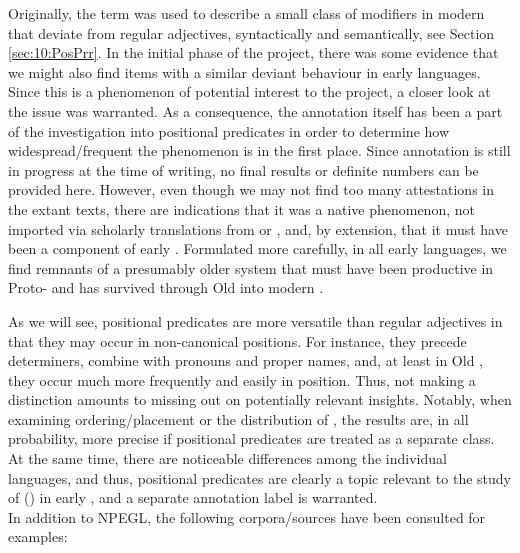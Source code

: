 \documentclass[output=paper,colorlinks,citecolor=brown]{langscibook}
\begin{document}
Originally, the term  was used to describe a small class of modifiers in modern  that deviate from regular adjectives, syntactically and semantically, see Section \ref{sec:10:PosPrr}. In the initial phase of the project, there was some evidence that we might also find items with a similar deviant behaviour in early  languages. Since this is a phenomenon of potential interest to the project, a closer look  at the issue was warranted. As a consequence, the annotation itself has been a part of the investigation into positional predicates in order to determine how widespread/frequent the phenomenon is %
in the first place. Since annotation is still in progress at the time of writing, no final results or definite numbers can be provided here. However, even though we may not find too many attestations in the extant texts, there are indications that it was a native phenomenon, not imported via scholarly translations from  or , and, by extension, that it must have been a component of early  . Formulated more carefully, in all early  languages, we find remnants of a presumably older system that must have been productive in  Proto- and has survived through Old  into modern .

As we will see, positional predicates are more versatile than regular adjectives in that they may occur in non-canonical  positions. For instance, they precede determiners, combine with pronouns and proper names, and, at least in Old , they occur much more frequently and easily in  position. Thus, not making a distinction amounts to missing out on potentially relevant insights.  Notably, when examining  ordering/placement or the distribution of , the results are, in all probability, more precise if positional predicates are treated as a separate class. At the same time, there are noticeable differences among the individual languages, and thus, positional predicates are clearly a topic relevant to the study of ()  in early , and a separate annotation label is warranted.  \\

\noindent In addition to NPEGL, the following corpora/sources have been consulted for examples:
\end{document}
